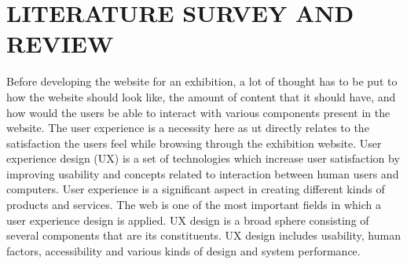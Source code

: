 
\chapter{LITERATURE SURVEY AND REVIEW} %
\label{ChapterLiteratureSurvey} %

Before developing the website for an exhibition, a lot of thought has to be put to how the website should look like, the amount of content that it should have, and how would the users be able to interact with various components present in the website. The user experience is a necessity here as ut directly relates to the satisfaction the users feel while browsing through the exhibition website. User experience design (UX) is a set of technologies which increase user satisfaction by improving usability and concepts related to interaction between human users and computers. User experience is a significant aspect in creating different kinds of products and services. The web is one of the most important fields in which a user experience design is applied. UX design is a broad sphere consisting of several components that are its constituents. UX design includes usability, human factors, accessibility and various kinds of design and system performance. 

